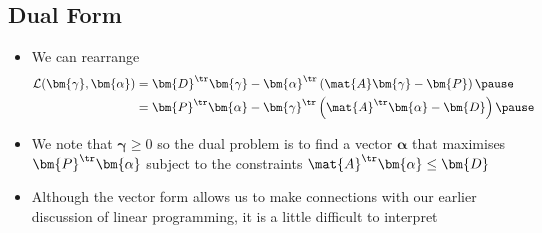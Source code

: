 \begin{slide}
\section{Dual Form}

\begin{PauseHighLight}
  \begin{itemize}
  \item We can rearrange
    \begin{align*}
      \mathcal{L}(\bm{\gamma},\bm{\alpha})
      &= \bm{D}^\tr \bm{\gamma} - \bm{\alpha}^\tr \left(
        \mat{A} \bm{\gamma} - \bm{P}\right)\pause \\
      &= \bm{P}^\tr \bm{\alpha} - \bm{\gamma}^\tr \left(
        \mat{A}^\tr \bm{\alpha} - \bm{D}\right)\pause
    \end{align*}
  \item We note that $\bm{\gamma}\geq 0$ so the dual problem is to
    find a vector $\bm{\alpha}$ that maximises $\bm{P}^\tr
    \bm{\alpha}$ subject to the constraints $\mat{A}^\tr \bm{\alpha}
    \leq \bm{D}$\pause
  \item Although the vector form allows us to make connections with
    our earlier discussion of linear programming, it is a little
    difficult to interpret\pause
  \end{itemize}
\end{PauseHighLight}

\end{slide}


